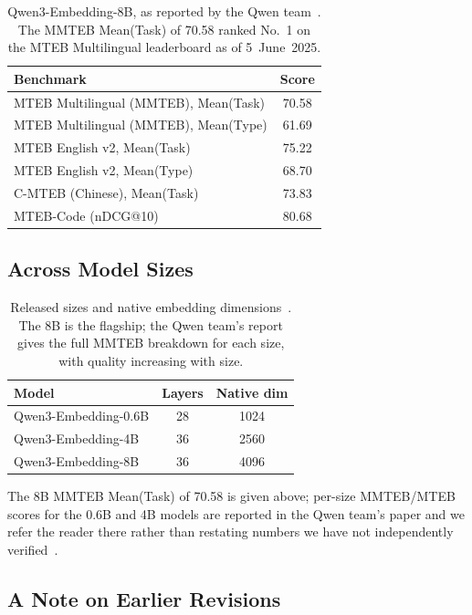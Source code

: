 \documentclass[11pt,a4paper]{article}
\begin{document}
\begin{table}[H]
\centering
\caption{Qwen3-Embedding-8B, as reported by the Qwen team~\cite{qwen3embedding}. The MMTEB
Mean(Task) of 70.58 ranked No.~1 on the MTEB Multilingual leaderboard as of 5~June~2025.}
\begin{tabular}{lc}
\toprule
\textbf{Benchmark} & \textbf{Score} \\
\midrule
MTEB Multilingual (MMTEB), Mean(Task) & 70.58 \\
MTEB Multilingual (MMTEB), Mean(Type) & 61.69 \\
MTEB English v2, Mean(Task)           & 75.22 \\
MTEB English v2, Mean(Type)           & 68.70 \\
C-MTEB (Chinese), Mean(Task)          & 73.83 \\
MTEB-Code (nDCG@10)                   & 80.68 \\
\bottomrule
\end{tabular}
\label{tab:qwen3emb-8b}
\end{table}

\subsection{Across Model Sizes}

\begin{table}[H]
\centering
\caption{Released sizes and native embedding dimensions~\cite{qwen3embedding}. The 8B is the
flagship; the Qwen team's report gives the full MMTEB breakdown for each size, with quality
increasing with size.}
\begin{tabular}{lcc}
\toprule
\textbf{Model} & \textbf{Layers} & \textbf{Native dim} \\
\midrule
Qwen3-Embedding-0.6B & 28 & 1024 \\
Qwen3-Embedding-4B   & 36 & 2560 \\
Qwen3-Embedding-8B   & 36 & 4096 \\
\bottomrule
\end{tabular}
\label{tab:qwen3emb-sizes}
\end{table}

The 8B MMTEB Mean(Task) of 70.58 is given above; per-size MMTEB/MTEB scores for the 0.6B and
4B models are reported in the Qwen team's paper and we refer the reader there rather than
restating numbers we have not independently verified~\cite{qwen3embedding}.

\subsection{A Note on Earlier Revisions}
\end{document}
